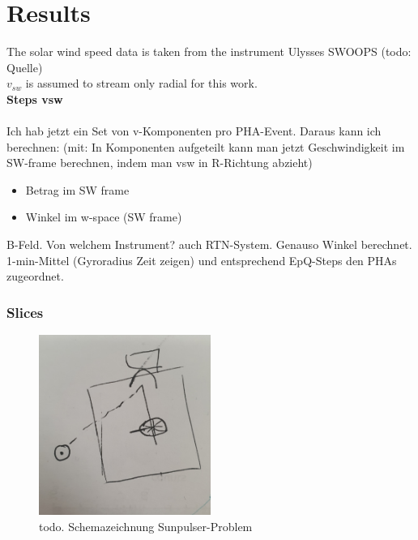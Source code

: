
\chapter{Results} %

\label{chap:results} %
The solar wind speed data is taken from the instrument Ulysses SWOOPS (todo: Quelle)\\
$v_{sw}$ is assumed to stream only radial for this work.\\
\textbf{Steps vsw} \\ \\
Ich hab jetzt ein Set von v-Komponenten pro PHA-Event. Daraus kann ich berechnen:
(mit: In Komponenten aufgeteilt kann man jetzt Geschwindigkeit im SW-frame berechnen, indem man vsw in R-Richtung abzieht)
\begin{itemize}
	\item Betrag im SW frame
	\item Winkel im w-space (SW frame)
\end{itemize}
B-Feld. Von welchem Instrument? auch RTN-System. Genauso Winkel berechnet.\\
1-min-Mittel (Gyroradius Zeit zeigen) und entsprechend EpQ-Steps den PHAs zugeordnet.
\subsection{Slices}
\begin{figure}[h]
	\includegraphics[width=0.5\textwidth]{Figures/dummy_sunpulse.jpg}
	\centering
	\caption{todo. Schemazeichnung Sunpulser-Problem}
	\label{fig:sp}
\end{figure}
%
%
%
